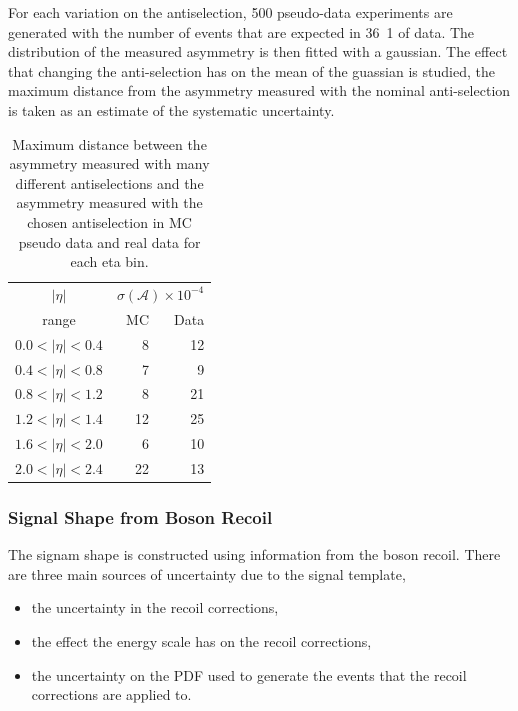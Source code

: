 For each variation on the antiselection, 500 pseudo-data experiments are
generated with the number of events that are expected in \unit{36.1}{\invpb} of
data. The distribution of the measured asymmetry is then fitted with a
gaussian.
The effect that changing the anti-selection has on the mean of the guassian is
studied, the maximum distance from the asymmetry measured with the nominal
anti-selection is taken as an estimate of the systematic uncertainty.

\begin{table}[htbp]
\begin{center}
\begin{tabular}{crr}
    \toprule
$|\eta|$  &\multicolumn{2}{c}{ $\sigma(\mathcal{A}) \times 10^{-4}$}\\
   range      & MC & Data\\
\midrule
$0.0<|\eta|<0.4$ & 8 & 12\\
$0.4<|\eta|<0.8$ & 7 & 9\\
$0.8<|\eta|<1.2$ & 8 & 21\\
$1.2<|\eta|<1.4$ & 12& 25\\
$1.6<|\eta|<2.0$ & 6 & 10\\
$2.0<|\eta|<2.4$ & 22& 13\\
    \bottomrule
\end{tabular}
\caption{Maximum distance between the asymmetry measured with many different antiselections
and the asymmetry measured with the chosen antiselection in MC pseudo data and real data for each eta bin.}
\label{tab:systQCD}
\end{center}
\end{table}


\subsubsection{Signal \ETm Shape from Boson Recoil}

The signam \ETm shape is constructed using information from the boson recoil.
There are three main sources of uncertainty due to the signal template,

\begin{itemize}
    \item the uncertainty in the recoil corrections,
    \item the effect the energy scale has on the recoil corrections,
    \item the uncertainty on the \ac{PDF} used to generate the events that the
recoil corrections are applied to.
\end{itemize}

